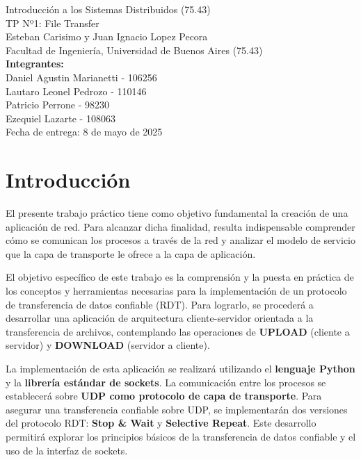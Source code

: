 \documentclass[a4paper,10pt]{article}
\begin{document}
\begin{titlepage}
    \centering
    \vspace*{3cm}
    {\Large {Introducción a los Sistemas Distribuidos (75.43)}}\\[0.5cm]
    {\Large{TP Nº1: File Transfer}}\\[1cm]
    {\large Esteban Carisimo y Juan Ignacio Lopez Pecora}\\[0.5cm]
    {\large Facultad de Ingeniería, Universidad de Buenos Aires (75.43)}\\[2cm]

    {\large \textbf{Integrantes:}}\\[0.5cm]
    {\large Daniel Agustin Marianetti - 106256}\\
    {\large Lautaro Leonel Pedrozo - 110146}\\
    {\large Patricio Perrone - 98230}\\
    {\large Ezequiel Lazarte - 108063}\\[3cm]

    {\large Fecha de entrega: 8 de mayo de 2025}
\end{titlepage}

\tableofcontents
\newpage

\section{Introducción}
El presente trabajo práctico tiene como objetivo fundamental la creación de una aplicación de red. Para alcanzar dicha finalidad, resulta indispensable comprender cómo se comunican los procesos a través de la red y analizar el modelo de servicio que la capa de transporte le ofrece a la capa de aplicación.

El objetivo específico de este trabajo es la comprensión y la puesta en práctica de los conceptos y herramientas necesarias para la implementación de un protocolo de transferencia de datos confiable (RDT). Para lograrlo, se procederá a desarrollar una aplicación de arquitectura cliente-servidor orientada a la transferencia de archivos, contemplando las operaciones de \textbf{UPLOAD} (cliente a servidor) y \textbf{DOWNLOAD} (servidor a cliente).

La implementación de esta aplicación se realizará utilizando el \textbf{lenguaje Python} y la \textbf{librería estándar de sockets}. La comunicación entre los procesos se establecerá sobre \textbf{UDP como protocolo de capa de transporte}. Para asegurar una transferencia confiable sobre UDP, se implementarán dos versiones del protocolo RDT: \textbf{Stop \& Wait} y \textbf{Selective Repeat}. Este desarrollo permitirá explorar los principios básicos de la transferencia de datos confiable y el uso de la interfaz de sockets.
\end{document}
